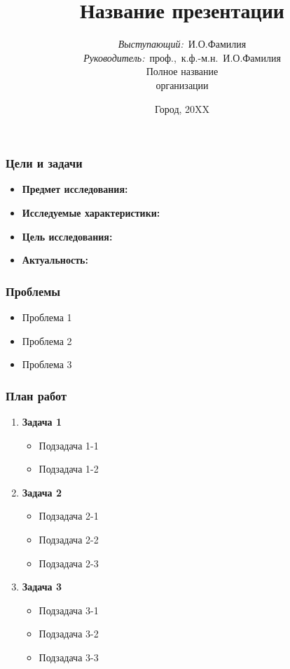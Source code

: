 \documentclass[14pt]{beamer}
\title{\small{Название презентации}}
\author{\small{%
\emph{Выступающий:}~И.О.Фамилия\\%
\emph{Руководитель:}~проф.,~к.ф.-м.н.~И.О.Фамилия}\\%
\vspace{30pt}%
Полное название\\
организации%
\vspace{20pt}%
}
\date{\small{Город, 20XX}}
\begin{document}
\maketitle

\begin{frame}
\frametitle{Цели и задачи}
\begin{itemize}
  \item \textbf{Предмет исследования:} 
  \item \textbf{Исследуемые характеристики:} 
  \item \textbf{Цель исследования:} 
  \item \textbf{Актуальность:} 
\end{itemize}
\end{frame}

\begin{frame}
\frametitle{Проблемы}
\begin{itemize}
  \item Проблема 1
  \item Проблема 2
  \item Проблема 3    
\end{itemize}
\end{frame}

\begin{frame}
\frametitle{План работ}
\begin{enumerate}
  \item \textbf{Задача 1}
  \begin{itemize}
    \item Подзадача 1-1
    \item Подзадача 1-2
  \end{itemize}
  \item \textbf{Задача 2}
  \begin{itemize}
    \item Подзадача 2-1
    \item Подзадача 2-2
    \item Подзадача 2-3
  \end{itemize}
  \item \textbf{Задача 3}
  \begin{itemize}
    \item Подзадача 3-1
    \item Подзадача 3-2
    \item Подзадача 3-3
  \end{itemize}
\end{enumerate}
\end{frame}
\end{document}
